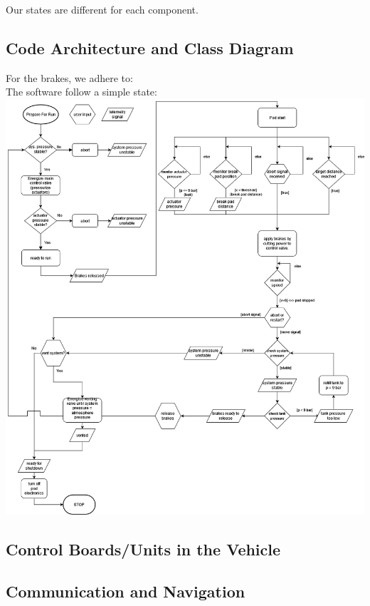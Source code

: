 Our states are different for each component.

\subsection{Code Architecture and Class Diagram}
For the brakes, we adhere to: \\

The software follow a simple state: \\
\includegraphics[width=\textwidth]{texfiles/elec/eimg/brakesoftware_ext}


\subsection{Control Boards/Units in the Vehicle}

\subsection{Communication and Navigation}

